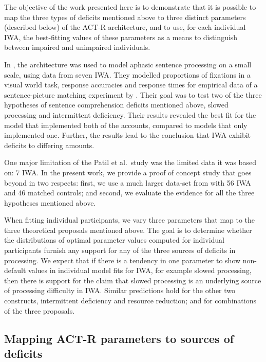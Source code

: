 \documentclass{cambridge7A}\usepackage[]{graphicx}\usepackage[]{color}
\begin{document}
The objective of the work presented here is to demonstrate that it is possible to map the three types of deficits mentioned above to three distinct parameters (described below) of the ACT-R architecture, and to use, for each individual IWA, the best-fitting values of these parameters as a means to distinguish between impaired and unimpaired individuals.

In \cite{PatilEtAl2016}, the \cite{LewisVasishth2005} architecture was used to model aphasic sentence processing on a small scale, using data from seven IWA. 
They modelled proportions of fixations in a visual world task, response accuracies and response times for empirical data of a sentence-picture matching experiment by \cite{hanneetal11}. Their goal was to test two of the three hypotheses of sentence comprehension deficits mentioned above, slowed processing and intermittent deficiency.  
Their results revealed the best fit for the model that implemented both of the accounts, compared to models that only implemented one. Further, the results lead to the conclusion that IWA exhibit deficits to differing amounts.

One major limitation of the Patil et al.\ study was the limited data it was based on: 7 IWA.
In the present work, we provide a proof of concept study that goes beyond \cite{PatilEtAl2016} in two respects: first, we use a much larger data-set from \cite{CaplanEtAl2015} with 56 IWA and 46 matched controls; and second, we evaluate the evidence for all the three hypotheses mentioned above. 

When fitting individual participants, we vary three parameters that map to the three theoretical proposals mentioned above. The goal is to determine whether the distributions of optimal parameter values computed for individual participants furnish any support for any of the three sources of deficits in processing. 
We expect that if there is a tendency in one parameter to show non-default values in individual model fits for IWA, for example slowed processing,
then there is support for the claim that slowed processing is an underlying source of processing difficulty in IWA. Similar predictions hold for the other two constructs, intermittent deficiency and resource reduction; and for combinations of the three proposals.

\subsection{Mapping ACT-R parameters to sources of deficits}
\end{document}
